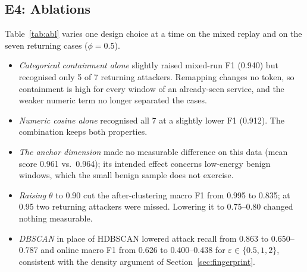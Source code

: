 \documentclass[conference]{IEEEtran}
\begin{document}
\subsection{E4: Ablations}
Table~\ref{tab:abl} varies one design choice at a time on the mixed replay and on the seven returning cases ($\phi=0.5$).
\begin{itemize}
\item \emph{Categorical containment alone} slightly raised mixed-run F1 (0.940) but recognised only 5 of 7 returning attackers. Remapping changes no token, so containment is high for every window of an already-seen service, and the weaker numeric term no longer separated the cases.
\item \emph{Numeric cosine alone} recognised all 7 at a slightly lower F1 (0.912). The combination keeps both properties.
\item \emph{The anchor dimension} made no measurable difference on this data (mean score 0.961 vs.\ 0.964); its intended effect concerns low-energy benign windows, which the small benign sample does not exercise.
\item \emph{Raising $\theta$} to 0.90 cut the after-clustering macro F1 from 0.995 to 0.835; at 0.95 two returning attackers were missed. Lowering it to 0.75--0.80 changed nothing measurable.
\item \emph{DBSCAN} in place of HDBSCAN lowered attack recall from 0.863 to 0.650--0.787 and online macro F1 from 0.626 to 0.400--0.438 for $\varepsilon\in\{0.5,1,2\}$, consistent with the density argument of Section~\ref{sec:fingerprint}.
\end{itemize}
\end{document}
